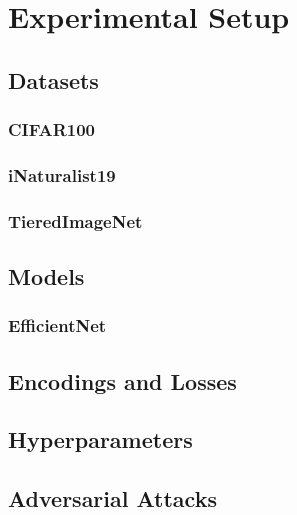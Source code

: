 \chapter{Experimental Setup}
\label{ch:experimental-setup}

\section{Datasets}
\label{sec:datasests}

\subsection{CIFAR100}
\label{subsec:cifar100}

\subsection{iNaturalist19}
\label{subsec:inaturalist19}

\subsection{TieredImageNet}
\label{subsec:tieredimagenet}


\section{Models}
\label{sec:models}

\subsection{EfficientNet}
\label{subsec:efficientnet}

\section{Encodings and Losses}
\label{sec:encodings-and-losses-experimental-setup}

\section{Hyperparameters}
\label{sec:hyperparameters-experimental-setup}

\section{Adversarial Attacks}
\label{sec:adversarial-attacks-experimental-setup}
